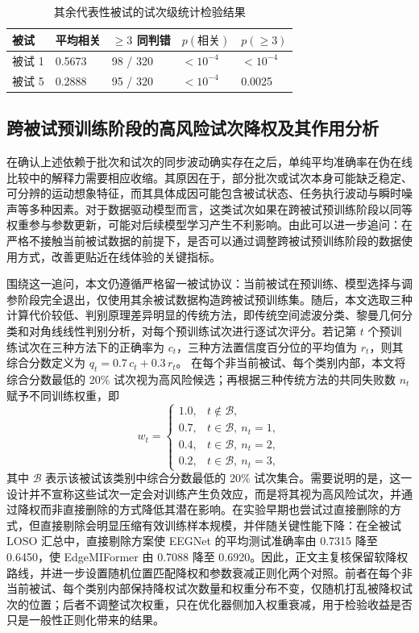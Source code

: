\begin{table}[htbp]
    \centering
    \small
    \caption{其余代表性被试的试次级统计检验结果}
    \label{tab:c5_trial_level_other_subjects}
    \setlength{\tabcolsep}{3pt}
    \begin{tabular}{p{1.4cm}p{1.7cm}p{2.1cm}p{1.5cm}p{1.5cm}}
        \hline
        被试 & 平均相关 & $\geq 3$ 同判错 & $p(\text{相关})$ & $p(\geq 3)$ \\
        \hline
        被试 1 & 0.5673 & 98 / 320 & $<10^{-4}$ & $<10^{-4}$ \\
        被试 5 & 0.2888 & 95 / 320 & $<10^{-4}$ & 0.0025 \\
        \hline
    \end{tabular}
\end{table}

\subsection{跨被试预训练阶段的高风险试次降权及其作用分析}

在确认上述依赖于批次和试次的同步波动确实存在之后，单纯平均准确率在伪在线比较中的解释力需要相应收缩。其原因在于，部分批次或试次本身可能缺乏稳定、可分辨的运动想象特征，而其具体成因可能包含被试状态、任务执行波动与瞬时噪声等多种因素。对于数据驱动模型而言，这类试次如果在跨被试预训练阶段以同等权重参与参数更新，可能对后续模型学习产生不利影响。由此可以进一步追问：在严格不接触当前被试数据的前提下，是否可以通过调整跨被试预训练阶段的数据使用方式，改善更贴近在线体验的关键指标。

围绕这一追问，本文仍遵循严格留一被试协议：当前被试在预训练、模型选择与调参阶段完全退出，仅使用其余被试数据构造跨被试预训练集。随后，本文选取三种计算代价较低、判别原理差异明显的传统方法，即传统空间滤波分类、黎曼几何分类和对角线线性判别分析，对每个预训练试次进行逐试次评分。若记第 $t$ 个预训练试次在三种方法下的正确率为 $c_t$，三种方法置信度百分位的平均值为 $r_t$，则其综合分数定义为 $q_t=0.7\,c_t+0.3\,r_t$。
在每个非当前被试、每个类别内部，本文将综合分数最低的 20\% 试次视为高风险候选；再根据三种传统方法的共同失败数 $n_t$ 赋予不同训练权重，即
\begin{equation}
w_t=
\begin{cases}
1.0, & t \notin \mathcal{B}, \\
0.7, & t \in \mathcal{B},\ n_t=1, \\
0.4, & t \in \mathcal{B},\ n_t=2, \\
0.2, & t \in \mathcal{B},\ n_t=3,
\end{cases}
\end{equation}
其中 $\mathcal{B}$ 表示该被试该类别中综合分数最低的 20\% 试次集合。需要说明的是，这一设计并不宣称这些试次一定会对训练产生负效应，而是将其视为高风险试次，并通过降权而非直接删除的方式降低其潜在影响。在实验早期也尝试过直接删除的方式，但直接剔除会明显压缩有效训练样本规模，并伴随关键性能下降：在全被试 LOSO 汇总中，直接剔除方案使 EEGNet 的平均测试准确率由 0.7315 降至 0.6450，使 EdgeMIFormer 由 0.7088 降至 0.6920。因此，正文主复核保留软降权路线，并进一步设置随机位置匹配降权和参数衰减正则化两个对照。前者在每个非当前被试、每个类别内部保持降权试次数量和权重分布不变，仅随机打乱被降权试次的位置；后者不调整试次权重，只在优化器侧加入权重衰减，用于检验收益是否只是一般性正则化带来的结果。

